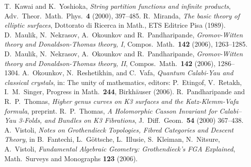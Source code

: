 \documentclass{amsart}
\theoremstyle{definition}
\begin{document}
\begin{thebibliography}{MNOP2}
 T.~Kawai and K.~Yoshioka, \emph{String partition functions and infinite products}, Adv.~Theor.~Math.~Phys.~\textbf{4} (2000), 397--485.
 R.~Miranda, \textit{The basic theory of elliptic surfaces}, Dottorato di Ricerca in Math., ETS Editrice Pisa (1989).
 D.~Maulik, N.~Nekrasov, A.~Okounkov and R.~Pandharipande, \textit{Gromov-{W}itten theory and {D}onaldson-{T}homas theory, {I}}, Compos.~Math.~\textbf{142} (2006), 1263--1285. %
 D.~Maulik, N.~Nekrasov, A.~Okounkov and R.~Pandharipande, \textit{Gromov-{W}itten theory and {D}onaldson-{T}homas theory, {II}}, Compos.~Math.~\textbf{142} (2006), 1286--1304. 
 A.~Okounkov, N.~Reshetikhin, and C.~Vafa, \textit{Quantum Calabi-Yau and classical crystals}, in: The unity of mathematics, editors: P.~Etingof, V.~Retakh, I.~M.~Singer, Progress in Math.~\textbf{244}, Birkh\"auser (2006).
 R.~Pandharipande and R.~P.~Thomas, \textit{Higher genus curves on K3 surfaces and the Katz-Klemm-Vafa formula}, preprint.
 R.~P.~Thomas, \textit{A Holomorphic Casson Invariant for Calabi--Yau 3-Folds, and Bundles on K3 Fibrations}, J.~Diff.~Geom.~\textbf{54} (2000) 367--438.
 A.~Vistoli, \textit{Notes on Grothendieck Topologies, Fibred Categories and Descent Theory}, in B.~Fantechi, L.~G\"ottsche, L.~Illusie, S.~Kleiman, N.~Nitsure, A.~Vistoli, \textit{Fundamental Algebraic Geometry: Grothendieck's FGA Explained}, Math.~Surveys and Monographs \textbf{123} (2006).
\end{thebibliography}
\end{document}
